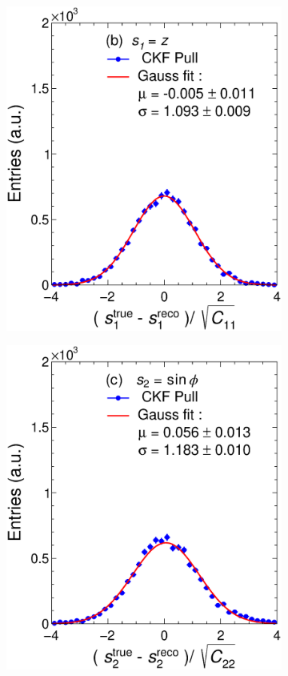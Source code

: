\begin{figure}[t]
\begin{subfigure}{0.32\textwidth}
         \includegraphics[width=\textwidth]{figures/ch5-KF_NDGAr/FullSample/Int/Units/IdealUnit1.eps}
         \caption{}
         \label{fig:resp1KFGAr_IntI}
     \end{subfigure}
    \begin{subfigure}{0.32\textwidth}
         \centering
         \includegraphics[width=\textwidth]{figures/ch5-KF_NDGAr/FullSample/Int/Units/IdealUnit2.eps}

\end{subfigure}
\end{figure}
